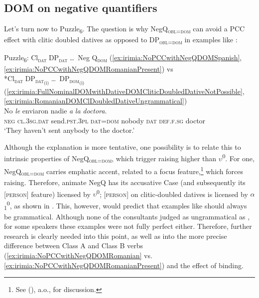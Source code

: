 \documentclass[output=paper,colorlinks,citecolor=brown,draft,draftmode]{langscibook}
\begin{document}
\subsection{DOM on negative quantifiers}\label{sec:irimia:DOMNegQuantifiers}

Let's turn now to Puzzle\textsubscript{6}. The question is why NegQ\textsubscript{\textsc{obl=dom}} can avoid a \textsc{PCC} effect with clitic doubled datives  as opposed to DP\textsubscript{\textsc{obl=dom}} in examples like :

\ea Puzzle\textsubscript{6}:
\Checkmark Cl\textsubscript{\textsc{dat}} DP\textsubscript{\textsc{dat}} \ldots\, Neg Q\textsubscript{\textsc{dom}} (\ref{ex:irimia:NoPCCwithNegQDOMSpanish}, \ref{ex:irimia:NoPCCwithNegQDOMRomanianPresent}) \hfill vs \\
\hskip 1.6cm *Cl\textsubscript{\textsc{dat}} DP\textsubscript{\textsc{dat}\textsubscript{(i)}} \ldots\, DP\textsubscript{\textsc{dom}\textsubscript{(i)}} (\ref{ex:irimia:FullNominalDOMwithDativeDOMCliticDoubledDativeNotPossible}, \ref{ex:irimia:RomanianDOMClDoubledDativeUngrammatical})\\
\gll No \textit{le} enviaron  nadie \textit{a} \textit{la} \textit{doctora}.\\
\textsc{neg} \textsc{cl.3sg.dat} send.\textsc{pst.3pl} \textsc{dat=dom} nobody \textsc{dat} \textsc{def.f.sg} doctor \\ 
\glt `They haven't sent anybody to the doctor.'  \label{ex:irimia:NoPCCwithNegQDOMSpanishRepeated}
\z

Although the explanation is more tentative, one possibility is to relate this to intrinsic properties of NegQ\textsubscript{\textsc{obl=dom}}, which trigger raising higher than $\upsilon$\textsuperscript{0}. For one,  NegQ\textsubscript{\textsc{obl=dom}} carries emphatic accent, related to a focus feature,\footnote{See \citeauthor{Giannak2020} (\citeyear{Giannak2020}), a.o., for discussion.} which forces raising. Therefore, animate NegQ has its accusative Case (and subsequently its [\textsc{person}] feature) licensed by $\upsilon$\textsuperscript{0}; \textsc{[person]}
on clitic-doubled datives is licensed by $\alpha$\textsubscript{1}\textsuperscript{0}, as shown in . This, however, would predict that examples like  should always be grammatical. Although none of the consultants judged  as ungrammatical as , for some speakers these examples were not fully perfect either. Therefore, further research is clearly needed into this point, as well as into the more precise difference between Class A and Class B verbs (\ref{ex:irimia:NoPCCwithNegQDOMRomanian} vs. \ref{ex:irimia:NoPCCwithNegQDOMRomanianPresent}) and the effect of binding.
\end{document}
